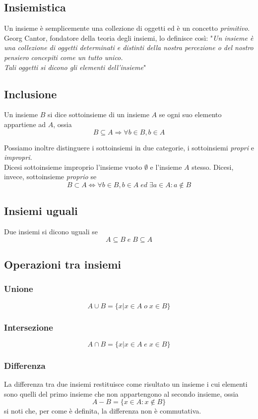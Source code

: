 \begin{flushleft}

\section{Insiemistica}
Un insieme è semplicemente una collezione di oggetti ed è un concetto \textit{primitivo}.\\
Georg Cantor, fondatore della teoria degli insiemi, lo definisce così: "\textit{Un insieme è una collezione di oggetti determinati e distinti della nostra percezione o del nostro pensiero concepiti come un tutto unico.\\
Tali oggetti si dicono gli elementi dell'insieme}"

\subsection{Inclusione}
Un insieme $B$ si dice sottoinsieme di un insieme $A$ se ogni suo elemento appartiene ad $A$, ossia
\[B\subseteq A \Rightarrow \forall b\in B, b\in A\]

Possiamo inoltre distinguere i sottoinsiemi in due categorie, i sottoinsiemi \textit{propri} e \textit{impropri}.\\
Dicesi sottoinsieme improprio l'insieme vuoto $\emptyset$ e l'insieme $A$ stesso.
Dicesi, invece, sottoinsieme \textit{proprio} se 
\[B\subset A \Leftrightarrow \forall b\in B, b\in A\;ed\;\exists a\in A:a\notin B\]

\subsection{Insiemi uguali}
Due insiemi si dicono uguali se
\[A\subseteq B\;e\;B\subseteq A\]


\subsection{Operazioni tra insiemi}
\subsubsection{Unione}
\[A \cup B = \{x|x\in A\;o\; x\in B\}\]


\subsubsection{Intersezione}
\[A \cap B = \{x|x\in A\; e\; x\in B\}\]


\subsubsection{Differenza}
La differenza tra due insiemi restituisce come risultato un insieme i cui elementi sono quelli del primo insieme che non appartengono al secondo insieme, ossia
\[A-B = \{x\in A:x\notin B\}\]
si noti che, per come è definita, la differenza non è commutativa.


\end{flushleft}
